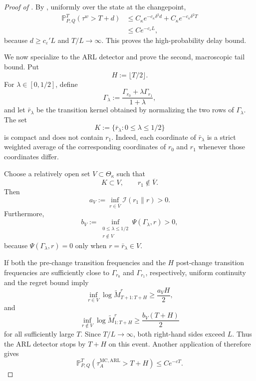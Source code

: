 \documentclass[12pt]{article}
\theoremstyle{spaced}
\theoremstyle{remark}
\begin{document}
\begin{proof}[Proof of ]
By , uniformly over the
state at the changepoint,
\begin{align}
    \mathbb P_{P,Q}^{T}(\tau^w>T+d)
    &\le
    C_\kappa e^{-c_\kappa\delta^2d}
    +
    C_\kappa e^{-c_\kappa\delta^2T}
    \nonumber\\
    &\le
    C e^{-c_\varepsilon L},
    \label{eq:markov-short-tail}
\end{align}
because \(d\ge c_\varepsilon' L\) and \(T/L\to\infty\). This proves
the high-probability delay bound.

We now specialize to the ARL detector and prove the second,
macroscopic tail bound. Put
\[
    H:=\lfloor T/2\rfloor.
\]
For \(\lambda\in[0,1/2]\), define
\[
    \Gamma_\lambda
    :=
    \frac{\Gamma_{r_0}+\lambda\Gamma_{r_1}}
         {1+\lambda},
\]
and let \(\bar r_\lambda\) be the transition kernel obtained by
normalizing the two rows of \(\Gamma_\lambda\). The set
\[
    K:=\{\bar r_\lambda:0\le\lambda\le1/2\}
\]
is compact and does not contain \(r_1\). Indeed, each coordinate of
\(\bar r_\lambda\) is a strict weighted average of the corresponding
coordinates of \(r_0\) and \(r_1\) whenever those coordinates differ.

Choose a relatively open set \(V\subset\Theta_\kappa\) such that
\[
    K\subset V,
    \qquad
    r_1\notin\overline V.
\]
Then
\[
    a_V
    :=
    \inf_{r\in\overline V}
    \mathcal I(r_1\|r)
    >0.
\]
Furthermore,
\[
    b_V
    :=
    \inf_{\substack{0\le\lambda\le1/2\\r\notin V}}
    \Psi(\Gamma_\lambda,r)
    >0,
\]
because \(\Psi(\Gamma_\lambda,r)=0\) only when
\(r=\bar r_\lambda\in V\).

If both the pre-change transition frequencies and the \(H\)
post-change transition frequencies are sufficiently close to
\(\Gamma_{r_0}\) and \(\Gamma_{r_1}\), respectively, uniform
continuity and the regret bound imply
\[
    \inf_{r\in V}
    \log\widetilde M_{T+1:T+H}^{r}
    \ge
    \frac{a_VH}{2},
\]
and
\[
    \inf_{r\notin V}
    \log\widetilde M_{1:T+H}^{r}
    \ge
    \frac{b_V(T+H)}{2}
\]
for all sufficiently large \(T\). Since \(T/L\to\infty\), both
right-hand sides exceed \(L\). Thus the ARL detector stops by
\(T+H\) on this event. Another application of
 therefore gives
\begin{equation}
\label{eq:markov-long-tail}
    \mathbb P_{P,Q}^{T}
    \left(
        \tau_A^{\mathrm{MC},\mathrm{ARL}}>T+H
    \right)
    \le
    C e^{-cT}.
\end{equation}


\end{proof}
\end{document}

